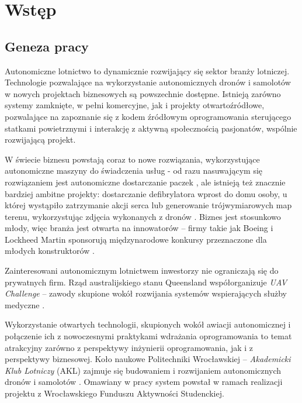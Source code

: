 \chapter{Wstęp}


\section{Geneza pracy}

Autonomiczne lotnictwo to dynamicznie rozwijający się sektor branży lotniczej.
Technologie pozwalające na wykorzystanie autonomicznych dronów i samolotów
w nowych projektach biznesowych są powszechnie dostępne. Istnieją
zarówno systemy zamknięte, w pełni komercyjne, jak i projekty otwartoźródłowe,
pozwalające na zapoznanie się z kodem źródłowym oprogramowania sterującego statkami
powietrznymi i interakcję z aktywną społecznością pasjonatów, wspólnie rozwijającą
projekt. 

W świecie biznesu powstają coraz to nowe rozwiązania, wykorzystujące autonomiczne
maszyny do świadczenia usług - od razu nasuwającym się rozwiązaniem
jest autonomiczne dostarczanie paczek \cite{prime_air}, ale istnieją też znacznie
bardziej ambitne projekty: dostarczanie defibrylatora wprost do domu osoby, u której
wystąpiło zatrzymanie akcji serca \cite{10.1001/jama.2017.3957} lub generowanie
trójwymiarowych map terenu, wykorzystując zdjęcia wykonanych z dronów
\cite{uav_photogrametry}. Biznes jest stosunkowo młody, więc branża jest otwarta
na innowatorów -- firmy takie jak Boeing i Lockheed Martin sponsorują międzynarodowe
konkursy przeznaczone dla młodych konstruktorów \cite{sae_2018}. 

Zainteresowani autonomicznym lotnictwem inwestorzy nie ograniczają się do
prywatnych firm. Rząd australijskiego stanu Queensland współorganizuje
\textit{UAV Challenge} -- zawody skupione wokół rozwijania systemów wspierających 
służby medyczne \cite{uav_sponsors}.

Wykorzystanie otwartych technologii, skupionych wokół awiacji autonomicznej
i połączenie ich z nowoczesnymi praktykami wdrażania oprogramowania to temat atrakcyjny
zarówno z perspektywy inżynierii oprogramowania, jak i z perspektywy biznesowej. 
Koło naukowe Politechniki Wrocławskiej -- \textit{Akademicki Klub Lotniczy} (AKL) zajmuje
się budowaniem i rozwijaniem autonomicznych dronów i samolotów \cite{akl_home_page}.
Omawiany w pracy system powstał w ramach realizacji projektu
z Wrocławskiego Funduszu Aktywności Studenckiej\cite{fast_webpage}.

